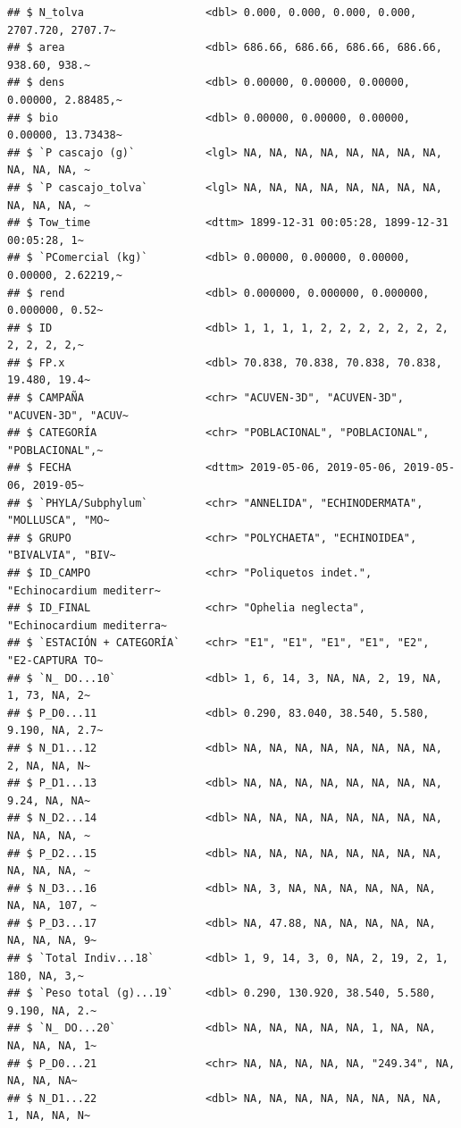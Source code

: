 \documentclass[
]{article}
\begin{document}
\begin{verbatim}
## $ N_tolva                   <dbl> 0.000, 0.000, 0.000, 0.000, 2707.720, 2707.7~
## $ area                      <dbl> 686.66, 686.66, 686.66, 686.66, 938.60, 938.~
## $ dens                      <dbl> 0.00000, 0.00000, 0.00000, 0.00000, 2.88485,~
## $ bio                       <dbl> 0.00000, 0.00000, 0.00000, 0.00000, 13.73438~
## $ `P cascajo (g)`           <lgl> NA, NA, NA, NA, NA, NA, NA, NA, NA, NA, NA, ~
## $ `P cascajo_tolva`         <lgl> NA, NA, NA, NA, NA, NA, NA, NA, NA, NA, NA, ~
## $ Tow_time                  <dttm> 1899-12-31 00:05:28, 1899-12-31 00:05:28, 1~
## $ `PComercial (kg)`         <dbl> 0.00000, 0.00000, 0.00000, 0.00000, 2.62219,~
## $ rend                      <dbl> 0.000000, 0.000000, 0.000000, 0.000000, 0.52~
## $ ID                        <dbl> 1, 1, 1, 1, 2, 2, 2, 2, 2, 2, 2, 2, 2, 2, 2,~
## $ FP.x                      <dbl> 70.838, 70.838, 70.838, 70.838, 19.480, 19.4~
## $ CAMPAÑA                   <chr> "ACUVEN-3D", "ACUVEN-3D", "ACUVEN-3D", "ACUV~
## $ CATEGORÍA                 <chr> "POBLACIONAL", "POBLACIONAL", "POBLACIONAL",~
## $ FECHA                     <dttm> 2019-05-06, 2019-05-06, 2019-05-06, 2019-05~
## $ `PHYLA/Subphylum`         <chr> "ANNELIDA", "ECHINODERMATA", "MOLLUSCA", "MO~
## $ GRUPO                     <chr> "POLYCHAETA", "ECHINOIDEA", "BIVALVIA", "BIV~
## $ ID_CAMPO                  <chr> "Poliquetos indet.", "Echinocardium mediterr~
## $ ID_FINAL                  <chr> "Ophelia neglecta", "Echinocardium mediterra~
## $ `ESTACIÓN + CATEGORÍA`    <chr> "E1", "E1", "E1", "E1", "E2", "E2-CAPTURA TO~
## $ `N_ DO...10`              <dbl> 1, 6, 14, 3, NA, NA, 2, 19, NA, 1, 73, NA, 2~
## $ P_D0...11                 <dbl> 0.290, 83.040, 38.540, 5.580, 9.190, NA, 2.7~
## $ N_D1...12                 <dbl> NA, NA, NA, NA, NA, NA, NA, NA, 2, NA, NA, N~
## $ P_D1...13                 <dbl> NA, NA, NA, NA, NA, NA, NA, NA, 9.24, NA, NA~
## $ N_D2...14                 <dbl> NA, NA, NA, NA, NA, NA, NA, NA, NA, NA, NA, ~
## $ P_D2...15                 <dbl> NA, NA, NA, NA, NA, NA, NA, NA, NA, NA, NA, ~
## $ N_D3...16                 <dbl> NA, 3, NA, NA, NA, NA, NA, NA, NA, NA, 107, ~
## $ P_D3...17                 <dbl> NA, 47.88, NA, NA, NA, NA, NA, NA, NA, NA, 9~
## $ `Total Indiv...18`        <dbl> 1, 9, 14, 3, 0, NA, 2, 19, 2, 1, 180, NA, 3,~
## $ `Peso total (g)...19`     <dbl> 0.290, 130.920, 38.540, 5.580, 9.190, NA, 2.~
## $ `N_ DO...20`              <dbl> NA, NA, NA, NA, NA, 1, NA, NA, NA, NA, NA, 1~
## $ P_D0...21                 <chr> NA, NA, NA, NA, NA, "249.34", NA, NA, NA, NA~
## $ N_D1...22                 <dbl> NA, NA, NA, NA, NA, NA, NA, NA, 1, NA, NA, N~

\end{verbatim}
\end{document}
